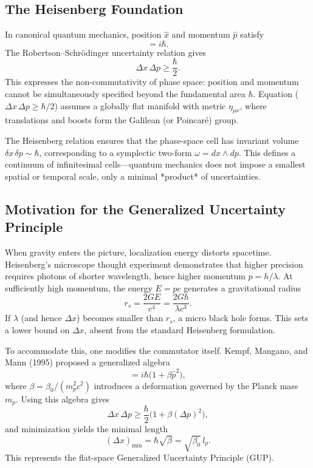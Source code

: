 \documentclass[11pt,oneside]{book}
\numberwithin{equation}{chapter}
\begin{document}
\subsection*{The Heisenberg Foundation}

In canonical quantum mechanics, position $\hat{x}$ and momentum $\hat{p}$ satisfy
\begin{equation}
[\hat{x},\hat{p}] = i\hbar.
\end{equation}
The Robertson–Schrödinger uncertainty relation gives
\begin{equation}
\Delta x\,\Delta p \ge \frac{\hbar}{2}.
\end{equation}
This expresses the non-commutativity of phase space: position and momentum cannot be simultaneously specified beyond the fundamental area $\hbar$.  
Equation (\(\Delta x\,\Delta p \ge \hbar/2\)) assumes a globally flat manifold with metric $\eta_{\mu\nu}$, where translations and boosts form the Galilean (or Poincaré) group.

The Heisenberg relation ensures that the phase-space cell has invariant volume $\delta x\,\delta p\sim\hbar$, corresponding to a symplectic two-form $\omega = dx\wedge dp$.  
This defines a continuum of infinitesimal cells—quantum mechanics does not impose a smallest spatial or temporal scale, only a minimal *product* of uncertainties.

\subsection*{Motivation for the Generalized Uncertainty Principle}

When gravity enters the picture, localization energy distorts spacetime.  
Heisenberg’s microscope thought experiment demonstrates that higher precision requires photons of shorter wavelength, hence higher momentum $p=h/\lambda$.  
At sufficiently high momentum, the energy $E=pc$ generates a gravitational radius
\begin{equation}
r_s = \frac{2GE}{c^4} = \frac{2G\hbar}{\lambda c^3}.
\end{equation}
If $\lambda$ (and hence $\Delta x$) becomes smaller than $r_s$, a micro black hole forms.  
This sets a lower bound on $\Delta x$, absent from the standard Heisenberg formulation.

To accommodate this, one modifies the commutator itself.  
Kempf, Mangano, and Mann (1995) proposed a generalized algebra
\begin{equation}
[\hat{x},\hat{p}] = i\hbar\big(1+\beta\hat{p}^2\big),
\end{equation}
where $\beta = \beta_0 / (m_p^2 c^2)$ introduces a deformation governed by the Planck mass $m_p$.  
Using this algebra gives
\begin{equation}
\Delta x\,\Delta p \ge \frac{\hbar}{2}\big(1+\beta(\Delta p)^2\big),
\end{equation}
and minimization yields the minimal length
\begin{equation}
(\Delta x)_{\min} = \hbar\sqrt{\beta} = \sqrt{\beta_0}\,l_p.
\end{equation}
This represents the flat-space Generalized Uncertainty Principle (GUP).
\end{document}
